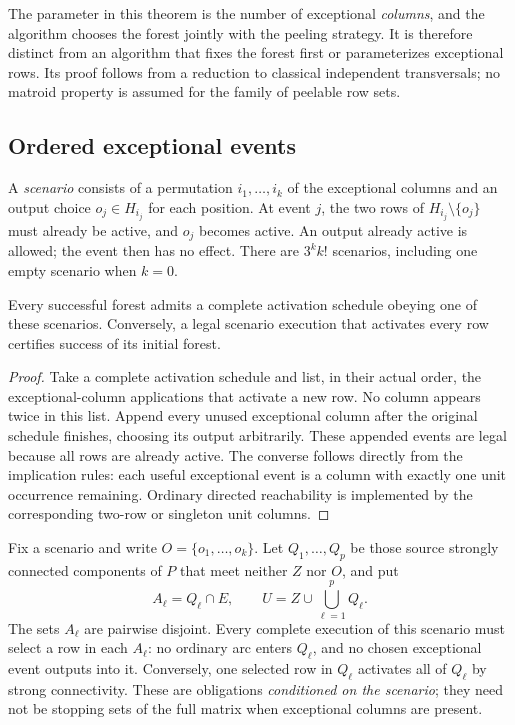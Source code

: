 The parameter in this theorem is the number of exceptional
\emph{columns}, and the algorithm chooses the forest jointly with the
peeling strategy. It is therefore distinct from an algorithm that fixes
the forest first or parameterizes exceptional rows. Its proof follows
from a reduction to classical independent transversals; no matroid
property is assumed for the family of peelable row sets.

\subsection{Ordered exceptional events}

A \emph{scenario} consists of a permutation $i_1,\ldots,i_k$ of the
exceptional columns and an output choice $o_j\in H_{i_j}$ for each
position. At event $j$, the two rows of $H_{i_j}\setminus\{o_j\}$
must already be active, and $o_j$ becomes active. An output already
active is allowed; the event then has no effect. There are $3^k k!$
scenarios, including one empty scenario when $k=0$.

\begin{lemma}
\label{lem:fpt-scenarios-complete}
Every successful forest admits a complete activation schedule obeying
one of these scenarios. Conversely, a legal scenario execution that
activates every row certifies success of its initial forest.
\end{lemma}
\begin{proof}
Take a complete activation schedule and list, in their actual order,
the exceptional-column applications that activate a new row. No column
appears twice in this list. Append every unused exceptional column after
the original schedule finishes, choosing its output arbitrarily. These
appended events are legal because all rows are already active. The
converse follows directly from the implication rules: each useful
exceptional event is a column with exactly one unit occurrence remaining.
Ordinary directed reachability is implemented by the corresponding
two-row or singleton unit columns.
\end{proof}

Fix a scenario and write $O=\{o_1,\ldots,o_k\}$. Let
$Q_1,\ldots,Q_p$ be those source strongly connected components of $P$
that meet neither $Z$ nor $O$, and put
\[
              A_\ell=Q_\ell\cap E,\qquad
              U=Z\cup\bigcup_{\ell=1}^p Q_\ell.
\]
The sets $A_\ell$ are pairwise disjoint. Every complete execution of
this scenario must select a row in each $A_\ell$: no ordinary arc enters
$Q_\ell$, and no chosen exceptional event outputs into it. Conversely,
one selected row in $Q_\ell$ activates all of $Q_\ell$ by strong
connectivity. These are obligations \emph{conditioned on the scenario};
they need not be stopping sets of the full matrix when exceptional
columns are present.

